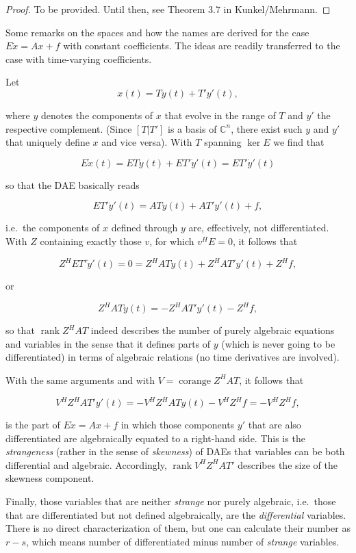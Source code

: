 \documentclass[]{book}
\theoremstyle{definition}
\theoremstyle{definition}
\theoremstyle{definition}
\theoremstyle{definition}
\theoremstyle{remark}
\begin{document}
\begin{proof}
{}To be provided. Until then, see Theorem 3.7 in Kunkel/Mehrmann.
\end{proof}
Some remarks on the spaces and how the names are derived for the case \(E\dot x = Ax +f\) with constant coefficients. The ideas are readily transferred to the case with time-varying coefficients.

Let
\[x(t) = Ty(t) + T'y'(t),\]

where \(y\) denotes the components of \(x\) that evolve in the range of \(T\) and \(y'\) the respective complement. (Since \([T|T']\) is a basis of \(\mathbb C^{n}\), there exist such \(y\) and \(y'\) that uniquely define \(x\) and vice versa). With \(T\) spanning \(\ker E\) we find that

\[
E \dot x(t) = ET\dot y(t) + ET'\dot y'(t) = ET'\dot y'(t)
\]

so that the DAE basically reads

\[ET'\dot y'(t) = ATy(t) + AT'y'(t)+f,\]

i.e.~the components of \(x\) defined through \(y\) are, effectively, not differentiated. With \(Z\) containing exactly those \(v\), for which \(v^HE=0\), it follows that

\[Z^HET'\dot y'(t) = 0 = Z^HATy(t) + Z^HAT'y'(t)+Z^Hf,\]

or

\[Z^HATy(t) = -Z^HAT'y'(t)-Z^Hf,\]

so that \(\operatorname{rank}Z^HAT\) indeed describes the number of purely algebraic equations and variables in the sense that it defines parts of \(y\) (which is never going to be differentiated) in terms of algebraic relations (no time derivatives are involved).

With the same arguments and with \(V=\operatorname{corange}Z^HAT\), it follows that

\[V^HZ^HAT'y'(t) = -V^HZ^HATy(t) -V^HZ^Hf=-V^HZ^Hf,\]

is the part of \(E\dot x = Ax + f\) in which those components \(y'\) that are also differentiated are algebraically equated to a right-hand side. This is the \emph{strangeness} (rather in the sense of \emph{skewness}) of DAEs that variables can be both differential and algebraic. Accordingly, \(\operatorname{rank}V^HZ^HAT'\) describes the size of the skewness component.

Finally, those variables that are neither \emph{strange} nor purely algebraic, i.e.~those that are differentiated but not defined algebraically, are the \emph{differential} variables. There is no direct characterization of them, but one can calculate their number as \(r-s\), which means number of differentiated minus number of \emph{strange} variables.
\end{document}
